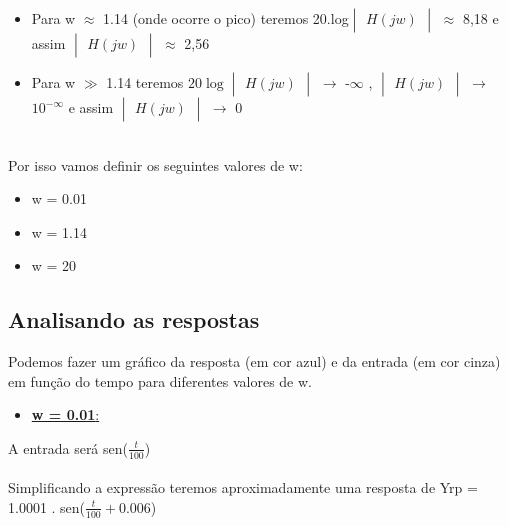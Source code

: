 \documentclass[a4paper,12pt,twoside]{article}
\begin{document}
\begin{itemize}
    \item Para w $\approx $ 1.14 (onde ocorre o pico) teremos
20.log$\begin{vmatrix}H(jw)\end{vmatrix}$ $\approx $ 8,18 e assim
$\begin{vmatrix}H(jw)\end{vmatrix}$ $\approx $ 2,56
\end{itemize}

\begin{itemize}
    \item Para w $\gg$ 1.14 teremos $20\log \begin{vmatrix}H(jw)\end{vmatrix}$ $\to$ -$\infty$ , $\begin{vmatrix}H(jw)\end{vmatrix}$ $\to$ $10^{-\infty }$ e assim $\begin{vmatrix}H(jw)\end{vmatrix}$ $\to$ 0
\end{itemize}
\\

Por isso vamos definir os seguintes valores de w:
\begin{itemize}
    \item w = 0.01
\end{itemize}
\begin{itemize}
    \item w = 1.14
\end{itemize}
\begin{itemize}
    \item w = 20
\end{itemize}


\subsection{Analisando as respostas}
Podemos fazer um gráfico da resposta (em cor azul) e da entrada (em cor cinza) em função do tempo para diferentes valores de w. 
\begin{itemize}
    \item \underline{\large{\textbf{w = 0.01}}:}
\end{itemize}
A entrada será sen($\frac{t}{100}$)\\ \\ 
Simplificando a expressão teremos aproximadamente uma resposta de Yrp = 1.0001 . sen($\frac{t}{100}+0.006$)
\end{document}
